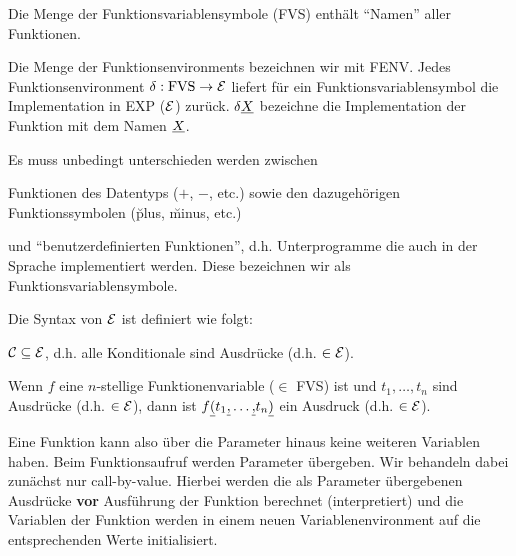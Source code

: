 \begin{defn}
Die Menge der Funktionsvariablensymbole (FVS) enthält ``Namen'' aller Funktionen.
\end{defn}

\begin{defn}
Die Menge der Funktionsenvironments bezeichnen wir mit FENV.
Jedes Funktionsenvironment $\delta: \text{FVS} \to \mathcal{E}$ liefert für ein Funktionsvariablensymbol die
Implementation in EXP ($\mathcal{E}$) zurück. $\delta\underline{X}$ bezeichne die Implementation der Funktion mit dem Namen $\underline{X}$.
\end{defn}

Es muss unbedingt unterschieden werden zwischen
\begin{\whichitem}
\item Funktionen des Datentyps ($+$, $-$, etc.) sowie den dazugehörigen Funktionssymbolen (\u{plus}, \u{minus}, etc.)
\item und ``benutzerdefinierten Funktionen'', d.h. Unterprogramme die auch in der Sprache implementiert werden. Diese bezeichnen wir als Funktionsvariablensymbole.
\end{\whichitem}

\begin{defn}
Die Syntax von $\mathcal{E}$ ist definiert wie folgt:
\begin{\whichitem}
\item $\mathcal{C} \subseteq \mathcal{E}$, d.h. alle Konditionale sind Ausdrücke (d.h. $\in \mathcal{E}$).
\item Wenn $f$ eine $n$-stellige Funktionenvariable ($\in$ FVS)
ist und $t_1,\ldots,t_n$ sind Ausdrücke (d.h. $\in \mathcal{E}$),
dann ist $f\underline{(}t_1\underline{,}\ldots\underline{,}t_n\underline{)}$ ein Ausdruck (d.h. $\in \mathcal{E}$).
\end{\whichitem}
\end{defn}

Eine Funktion kann also über die Parameter hinaus keine weiteren Variablen haben.
Beim Funktionsaufruf werden Parameter übergeben. Wir behandeln dabei zunächst nur call-by-value.
Hierbei werden die als Parameter übergebenen Ausdrücke \textbf{vor} Ausführung der Funktion
berechnet (interpretiert) und die Variablen der Funktion werden in einem neuen Variablenenvironment
auf die entsprechenden Werte initialisiert.

